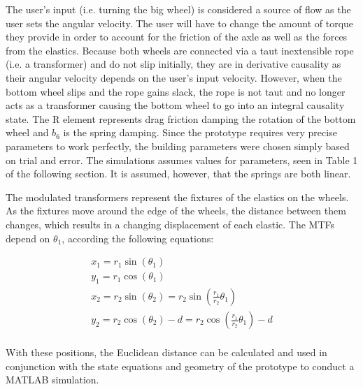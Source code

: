 \documentclass[twoside,twocolumn]{article}
\begin{document}
The user's input (i.e. turning the big wheel) is considered a source of flow as the user sets the angular velocity. The user will have to change the amount of torque they provide in order to account for the friction of the axle as well as the forces from the elastics. Because both wheels are connected via a taut inextensible rope (i.e. a transformer) and do not slip initially, they are in derivative causality as their angular velocity depends on the user's input velocity. However, when the bottom wheel slips and the rope gains slack, the rope is not taut and no longer acts as a transformer causing the bottom wheel to go into an integral causality state. The R element represents drag friction damping the rotation of the bottom wheel and $b_6$ is the spring damping. Since the prototype requires very precise parameters to work perfectly, the building parameters were chosen simply based on trial and error. The simulations assumes values for parameters, seen in Table 1 of the following section. It is assumed, however, that the springs are both linear.

The modulated transformers represent the fixtures of the elastics on the wheels. As the fixtures move around the edge of the wheels, the distance between them changes, which results in a changing displacement of each elastic. The MTFs depend on $\theta_1$, according the following equations:

\begin{gather*}
x_1 = r_1 \sin(\theta_1) \\
y_1 = r_1 \cos(\theta_1) \\
x_2 = r_2 \sin(\theta_2) = r_2 \sin \left( \frac{r_1}{r_2} \theta_1 \right) \\
y_2 = r_2 \cos(\theta_2) - d = r_2 \cos \left( \frac{r_1}{r_2} \theta_1 \right) - d \\
\end{gather*}

With these positions, the Euclidean distance can be calculated and used in conjunction with the state equations and geometry of the prototype to conduct a MATLAB simulation.


\end{document}
